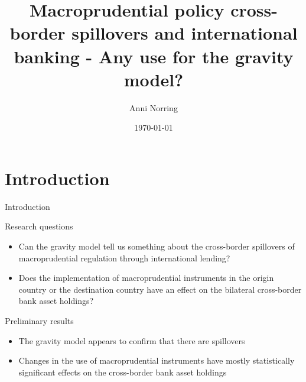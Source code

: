 \documentclass{beamer}
\title[Macroprudential tools, cross-border banking and gravity]{Macroprudential policy cross-border spillovers and international banking - Any use for the gravity model?}
\author{Anni Norring}
\institute{University of Helsinki}
\date{\today}
\begin{document}

\begin{frame}
  \titlepage
\end{frame}

\section{Introduction}


\begin{frame}{Introduction}
\begin{block}{Research questions}
\begin{itemize}
\item Can the gravity model tell us something about the cross-border spillovers of macroprudential regulation through international lending?
\item Does the implementation of macroprudential instruments in the origin country or the destination country have an effect on the bilateral cross-border bank asset holdings?
\end{itemize}
\end{block}
\begin{block}{Preliminary results}
\begin{itemize}
\item The gravity model appears to confirm that there are spillovers
\item Changes in the use of macroprudential instruments have mostly statistically significant effects on the cross-border bank asset holdings
\end{itemize}
\end{block}
\end{frame}
\end{document}
